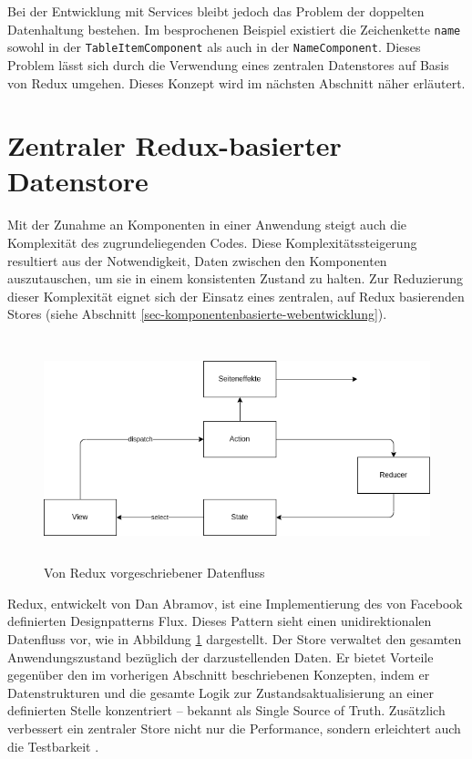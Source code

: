 \documentclass[12pt]{book}          %
\begin{document}
Bei der Entwicklung mit Services bleibt jedoch das Problem der doppelten Datenhaltung bestehen. Im besprochenen Beispiel existiert die Zeichenkette \texttt{name} sowohl in der \texttt{TableItemComponent} als auch in der \texttt{NameComponent}. Dieses Problem lässt sich durch die Verwendung eines zentralen Datenstores auf Basis von Redux umgehen. Dieses Konzept wird im nächsten Abschnitt näher erläutert.


\section{Zentraler Redux-basierter Datenstore}
\label{sec-zentraler-redux-datenstore}

Mit der Zunahme an Komponenten in einer Anwendung steigt auch die Komplexität des zugrundeliegenden Codes. Diese Komplexitätssteigerung resultiert aus der Notwendigkeit, Daten zwischen den Komponenten auszutauschen, um sie in einem konsistenten Zustand zu halten. Zur Reduzierung dieser Komplexität eignet sich der Einsatz eines zentralen, auf Redux basierenden Stores (siehe Abschnitt \ref{sec-komponentenbasierte-webentwicklung}).

\begin{figure}[htbp]
\centering
\includegraphics[height=6.5cm]{abbildungen/redux-dataflow.png}
\caption{Von Redux vorgeschriebener Datenfluss}
\label{redux-dataflow}
\end{figure}

Redux, entwickelt von Dan Abramov, ist eine Implementierung des von Facebook definierten Designpatterns Flux. Dieses Pattern sieht einen unidirektionalen Datenfluss vor, wie in Abbildung \ref{redux-dataflow} dargestellt. Der Store verwaltet den gesamten Anwendungszustand bezüglich der darzustellenden Daten. Er bietet Vorteile gegenüber den im vorherigen Abschnitt beschriebenen Konzepten, indem er Datenstrukturen und die gesamte Logik zur Zustandsaktualisierung an einer definierten Stelle konzentriert – bekannt als Single Source of Truth. Zusätzlich verbessert ein zentraler Store nicht nur die Performance, sondern erleichtert auch die Testbarkeit \cite[31-32]{farhi_adding_2017}.
\end{document}
